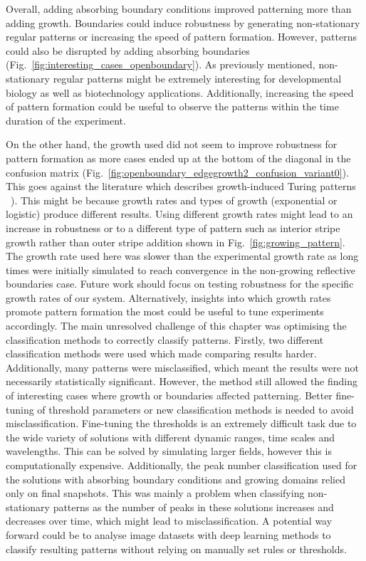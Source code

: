 Overall, adding absorbing boundary conditions improved patterning more than adding growth.
Boundaries could induce robustness by generating non-stationary regular patterns or increasing the speed of pattern formation.
However, patterns could also be disrupted by adding absorbing boundaries (Fig.~\ref{fig:interesting_cases_openboundary}).
As previously mentioned, non-stationary regular patterns might be extremely interesting for developmental biology as well as biotechnology applications.
Additionally, increasing the speed of pattern formation could be useful to observe the patterns within the time duration of the experiment.

On the other hand, the growth used did not seem to improve robustness for pattern formation as more cases ended up at the bottom of the diagonal in the confusion matrix (Fig.~\ref{fig:openboundary_edgegrowth2_confusion_variant0}).
This goes against the literature which describes growth-induced Turing patterns ~\parencite{gaffney2010}).
This might be because growth rates and types of growth (exponential or logistic) produce different results.
Using different growth rates might lead to an increase in robustness or to a different type of pattern such as interior stripe growth rather than outer stripe addition shown in Fig.~\ref{fig:growing_pattern}.
The growth rate used here was slower than the experimental growth rate as long times were initially simulated to reach convergence in the non-growing reflective boundaries case.
Future work should focus on testing robustness for the specific growth rates of our system.
Alternatively, insights into which growth rates promote pattern formation the most could be useful to tune experiments accordingly.
The main unresolved challenge of this chapter was optimising the classification methods to correctly classify patterns.
Firstly, two different classification methods were used which made comparing results harder.
Additionally, many patterns were misclassified, which meant the results were not necessarily statistically significant.
However, the method still allowed the finding of interesting cases where growth or boundaries affected patterning.
Better fine-tuning of threshold parameters or new classification methods is needed to avoid misclassification.
Fine-tuning the thresholds is an extremely difficult task due to the wide variety of solutions with different dynamic ranges, time scales and wavelengths.
This can be solved by simulating larger fields, however this is computationally expensive.
Additionally, the peak number classification used for the solutions with absorbing boundary conditions and growing domains relied only on final snapshots.
This was mainly a problem when classifying non-stationary patterns as the number of peaks in these solutions increases and decreases over time, which might lead to misclassification.
A potential way forward could be to analyse image datasets with deep learning methods to classify resulting patterns without relying on manually set rules or thresholds.